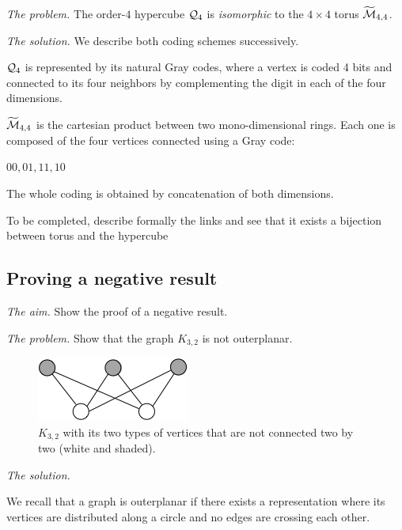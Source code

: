 \noindent \textit{The problem.}
The order-$4$ hypercube $\mbox{$\cal Q$}_4$ is \textit{isomorphic} to the $4 \times
4$ torus $\widetilde{\mbox{$\cal M$}}_{4,4}$.
\medskip

\noindent \textit{The solution.}
We describe both coding schemes successively. 

$\mbox{$\cal Q$}_4$ is represented by its natural Gray codes,
where a vertex is coded 4 bits and connected to its four neighbors by complementing 
the digit in each of the four dimensions.
\medskip

$\widetilde{\mbox{$\cal M$}}_{4,4}$ is the cartesian product between two mono-dimensional rings.
Each one is composed of the four vertices connected using a Gray code:

$00, 01, 11, 10$

The whole coding is obtained by concatenation of both dimensions.
\medskip

{\Denis To be completed, describe formally the links and see that it exists a bijection between torus and the hypercube}


\subsection{Proving a negative result}

\noindent \textit{The aim.}
Show the proof of a negative result.
\medskip

\noindent \textit{The problem.}
Show that the graph $K_{3,2}$ is not outerplanar.
\begin{figure}[h]
\begin{center}
        \includegraphics[scale=0.4]{FiguresGraph/outerplanarK3,2init}
        \caption{$K_{3,2}$ with its two types of vertices that are not connected two by two (white and shaded).}
\end{center}
\end{figure}
\medskip

\noindent \textit{The solution.}

We recall that a graph is outerplanar if there exists a representation where its vertices are distributed along a circle 
and no edges are crossing each other.

